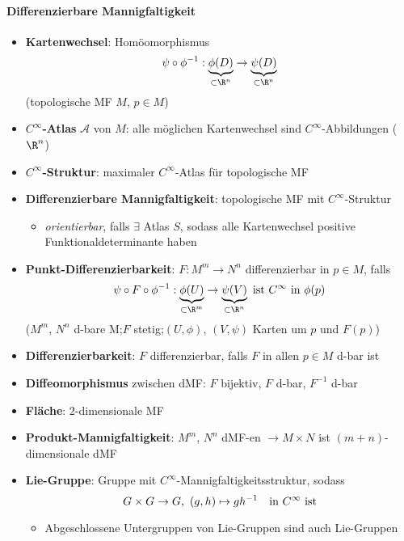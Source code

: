 \paragraph{Differenzierbare Mannigfaltigkeit}
\begin{itemize}
  \item \textbf{Kartenwechsel}: Homöomorphismus
  \begin{equation*}
    \psi \circ \phi^{-1} : \underbrace{\phi(D)}_{\subset \R^n} \to \underbrace{\psi(D)}_{\subset \R^n}
  \end{equation*}
  (topologische MF \( M \), \( p \in M \))
  \item \textbf{\( C^\infty \)-Atlas} \( \mathcal{A} \) von \( M \): alle möglichen Kartenwechsel sind \( C^\infty \)-Abbildungen (\( \R^n \))
  \item \textbf{\( C^\infty \)-Struktur}: maximaler \( C^\infty \)-Atlas für topologische MF
  \item \textbf{Differenzierbare Mannigfaltigkeit}: topologische MF mit \( C^\infty \)-Struktur
  \begin{itemize}
    \item \emph{orientierbar}, falls \( \exists \) Atlas \( S \), sodass alle Kartenwechsel positive Funktionaldeterminante haben
  \end{itemize}
  \item \textbf{Punkt-Differenzierbarkeit}: \( F : M^m \to N^n \) differenzierbar in \( p \in M \), falls
  \begin{equation*}
    \psi \circ F \circ \phi^{-1} : \underbrace{\phi(U)}_{\subset \R^m} \to \underbrace{\psi(V)}_{\subset \R^n} \text{ ist \( C^\infty \) in \( \phi(p) \)}
  \end{equation*}
  (\( M^m \), \( N^n \) d-bare M;\@ \( F \) stetig;\@ \( (U,\phi) \), \( (V,\psi) \) Karten um \( p \) und \( F(p) \))
  \item \textbf{Differenzierbarkeit}: \( F \) differenzierbar, falls \( F \) in allen \( p \in M \) d-bar ist
  \item \textbf{Diffeomorphismus} zwischen dMF: \( F \) bijektiv, \( F \) d-bar, \( F^{-1} \) d-bar 
  \item \textbf{Fläche}: \( 2 \)-dimensionale MF
  \item \textbf{Produkt-Mannigfaltigkeit}: \( M^m \), \( N^n \) dMF-en \( \to M \times N \) ist \( (m+n) \)-dimensionale dMF
  \item \textbf{Lie-Gruppe}: Gruppe mit \( C^\infty \)-Mannigfaltigkeitsstruktur, sodass
  \begin{equation*}
    G \times G \to G\text{,} \enskip (g,h) \mapsto gh^{-1} \quad \text{in \( C^\infty \) ist}
  \end{equation*}
  \begin{itemize}
    \item Abgeschlossene Untergruppen von Lie-Gruppen sind auch Lie-Gruppen
  \end{itemize}
\end{itemize}

